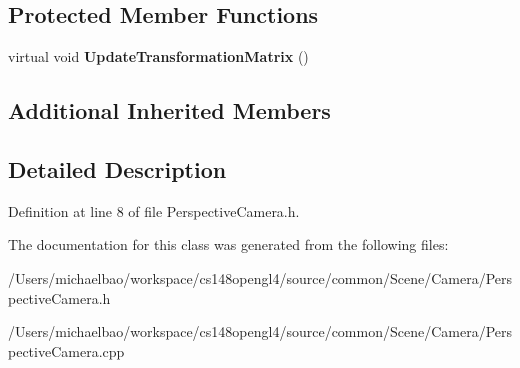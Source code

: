 \subsection*{Protected Member Functions}
\begin{DoxyCompactItemize}
\item 
\hypertarget{class_perspective_camera_a2f17fb07425e2146d5692805753fa368}{}virtual void {\bfseries Update\+Transformation\+Matrix} ()\label{class_perspective_camera_a2f17fb07425e2146d5692805753fa368}

\end{DoxyCompactItemize}
\subsection*{Additional Inherited Members}


\subsection{Detailed Description}


Definition at line 8 of file Perspective\+Camera.\+h.



The documentation for this class was generated from the following files\+:\begin{DoxyCompactItemize}
\item 
/\+Users/michaelbao/workspace/cs148opengl4/source/common/\+Scene/\+Camera/Perspective\+Camera.\+h\item 
/\+Users/michaelbao/workspace/cs148opengl4/source/common/\+Scene/\+Camera/Perspective\+Camera.\+cpp\end{DoxyCompactItemize}
